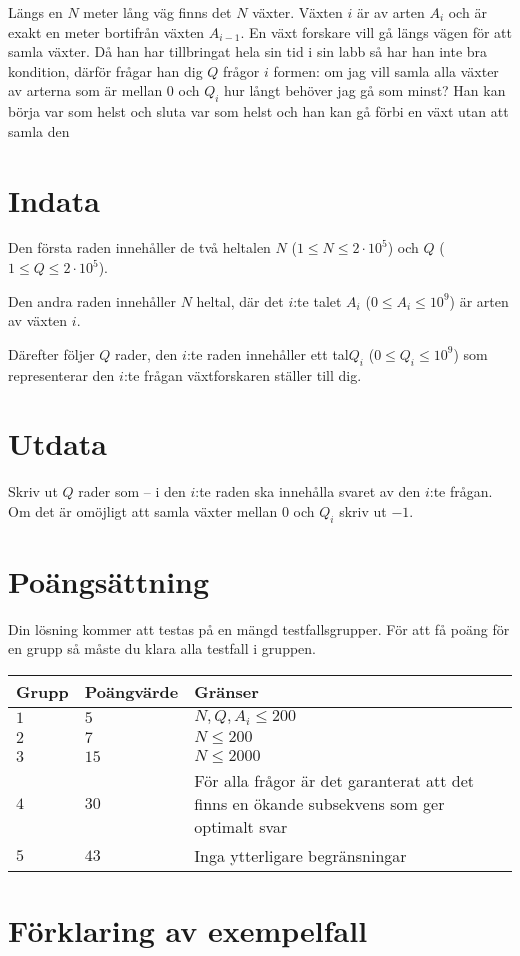 Längs en $N$ meter lång väg finns det $N$ växter. Växten $i$ är av arten $A_i$ och är exakt en meter bortifrån växten $A_{i-1}$. En växt forskare vill gå längs vägen för att samla växter. Då han har tillbringat hela sin tid i sin labb så har han inte bra kondition,
därför frågar han dig $Q$ frågor $i$ formen: om jag vill samla alla växter av arterna som är mellan $0$ och $Q_i$ hur långt behöver jag gå som minst?
Han kan börja var som helst och sluta var som helst och han kan gå förbi en växt utan att samla den
\section*{Indata}
Den första raden innehåller de två heltalen $N$ ($1\leq N \leq 2 \cdot 10^5$) och $Q$ ($1 \leq Q \leq 2 \cdot 10^5$).

Den andra raden innehåller $N$ heltal, där det $i$:te talet $A_i$ ($0\le A_i \le 10^9$) är arten av växten $i$.

Därefter följer $Q$ rader, den $i$:te raden innehåller ett tal$Q_i$ ($0 \leq Q_i \leq 10^9$) som representerar den $i$:te frågan växtforskaren ställer till dig.

\section*{Utdata}
Skriv ut $Q$ rader som -- i den $i$:te raden ska innehålla svaret av den $i$:te frågan. Om det är omöjligt att samla växter mellan $0$ och $Q_i$  skriv ut $-1$.

\section*{Poängsättning}
Din lösning kommer att testas på en mängd testfallsgrupper.
För att få poäng för en grupp så måste du klara alla testfall i gruppen.

\noindent
\begin{tabular}{| l | l | p{12cm} |}
  \hline
  Grupp & Poängvärde & Gränser \\ \hline
  $1$   & $5$       & $N,Q, A_i \leq 200 $\\ \hline
  $2$   & $7$       & $N \leq 200 $\\ \hline
  $3$   & $15$       & $N \leq 2000 $  \\ \hline
  $4$   & $30$       &  För alla frågor är det garanterat att det finns en ökande subsekvens som ger optimalt svar \\ \hline
  $5$   & $43$       & Inga ytterligare begränsningar \\ \hline
\end{tabular}

\section*{Förklaring av exempelfall}

